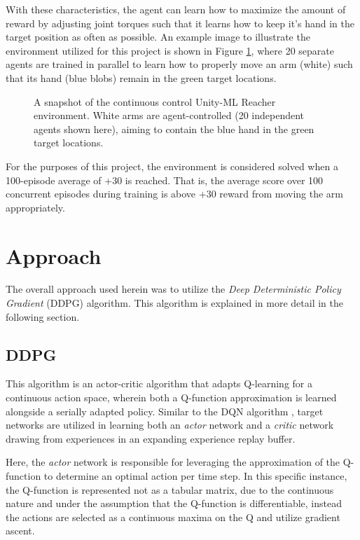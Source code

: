 \documentclass[11pt]{article}
\begin{document}
	\FloatBarrier
	
	With these characteristics, the agent can learn how to maximize the amount of reward by adjusting joint torques such that it learns how to keep it's hand in the target position as often as possible. An example image to illustrate the environment utilized for this project is shown in Figure \ref{fig:example-game-image}, where 20 separate agents are trained in parallel to learn how to properly move an arm (white) such that its hand (blue blobs) remain in the green target locations.
	
	\begin{figure}[!ht]
		\centering
		\caption{A snapshot of the continuous control Unity-ML Reacher environment. White arms are agent-controlled (20 independent agents shown here), aiming to contain the blue hand in the green target locations.}
		\label{fig:example-game-image}
	\end{figure}
	
	\FloatBarrier
	
	For the purposes of this project, the environment is considered solved when a 100-episode average of +30 is reached. That is, the average score over 100 concurrent episodes during training is above +30 reward from moving the arm appropriately.
	
	\section{Approach}
	
	The overall approach used herein was to utilize the \textit{Deep Deterministic Policy Gradient} (DDPG) algorithm. This algorithm is explained in more detail in the following section.
	
	\subsection{DDPG}
	
	This algorithm is an actor-critic algorithm that adapts Q-learning for a continuous action space, wherein both a Q-function approximation is learned alongside a serially adapted policy. Similar to the DQN algorithm \cite{dqn}, target networks are utilized in learning both an \textit{actor} network and a \textit{critic} network drawing from experiences in an expanding experience replay buffer.
	
	Here, the \textit{actor} network is responsible for leveraging the approximation of the Q-function to determine an optimal action per time step. In this specific instance, the Q-function is represented not as a tabular matrix, due to the continuous nature and under the assumption that the Q-function is differentiable, instead the actions are selected as a continuous maxima on the Q and utilize gradient ascent.
	
\end{document}

